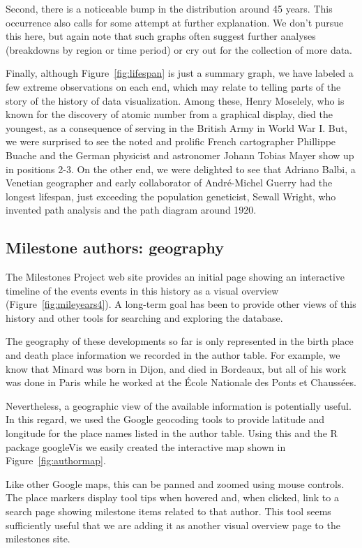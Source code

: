 \documentclass[11pt]{article}
\newcommand*{\figref}[1]{Figure~\ref{#1}}
\begin{document}
Second, there is a noticeable bump in the distribution around 45 years. This
occurrence also calls for some attempt at further explanation.
We don't pursue this here, but again note that such graphs often suggest
further analyses (breakdowns by region or time period)
or cry out for the collection of more data.

Finally, although \figref{fig:lifespan} is just a summary graph, we have labeled a few
extreme observations on each end, which may relate to telling parts of the story of the
history of data visualization.  Among these, Henry Moselely, who is known for the
discovery of atomic number from a graphical display, died the youngest, as a consequence
of serving in the British Army in World War I. But, we were surprised to see
the noted and prolific French cartographer Phillippe Buache
and the German physicist and astronomer Johann Tobias Mayer show up in positions
2-3.  On the other end, we were delighted to see that Adriano Balbi,
a Venetian geographer and early collaborator of Andr{\'e}-Michel Guerry
\citep{BalbiGuerry:1829} had the longest lifespan,
just exceeding the population geneticist, Sewall Wright, who invented
path analysis and the path diagram around 1920.

\subsection{Milestone authors: geography}\label{sec:geography}
The Milestones Project web site provides an initial page showing an interactive timeline
of the events events in this history as a visual overview (\figref{fig:mileyears4}).
A long-term goal has been to
provide other views of this history and other tools for searching and exploring the
database.

The geography of these developments so far is only represented in the birth place
and death place information we recorded in the author table.
For example, we know that Minard was born in Dijon, and died in Bordeaux, but
all of his work was done in Paris while he worked at the
{\'E}cole Nationale des Ponts et Chauss{\'e}es.

Nevertheless, a geographic view of the available information is potentially useful.
In this regard, we used the Google geocoding tools to provide latitude and
longitude for the place names listed in the author table.  Using this and the
R package googleVis \citep{googleVis} we easily created the interactive map shown
in \figref{fig:authormap}.

Like other Google maps, this can be panned and zoomed using mouse controls.
The place markers display tool tips when hovered and, when clicked, link to
a search page showing milestone items related to that author.
This tool seems sufficiently useful that we are adding it as another visual
overview page to the milestones site.
\end{document}
